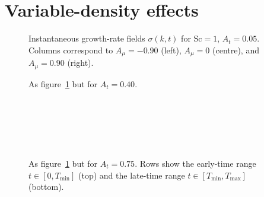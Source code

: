 \section{Variable-density effects}
\label{sec:variable_density}

\newcommand{\sigmarow}[3]{%
  \begin{minipage}{0.32\linewidth}\centering\end{minipage}\hfill
  \begin{minipage}{0.32\linewidth}\centering\end{minipage}\hfill
  \begin{minipage}{0.32\linewidth}\centering\end{minipage}%
}


\begin{figure}[p]
  \centering
  \sigmarow{VD_P1_Sc1_At0p05}{full}{}
  \caption{Instantaneous growth-rate fields $\sigma(k,t)$ for $\mathrm{Sc}=1$, $A_t=0.05$.
           Columns correspond to $A_\mu=-0.90$ (left), $A_\mu=0$ (centre), and $A_\mu=0.90$ (right).}
  \label{fig:VD_sigma_Sc1_At0p05}
\end{figure}

\begin{figure}[p]
  \centering
  \sigmarow{VD_P1_Sc1_At0p40}{full}{}
  \caption{As figure~\ref{fig:VD_sigma_Sc1_At0p05} but for $A_t=0.40$.}
  \label{fig:VD_sigma_Sc1_At0p40}
\end{figure}

\begin{figure}[p]
  \centering
  \begin{minipage}[t]{0.32\linewidth}\centering
    \\[2pt]
    
  \end{minipage}\hfill
  \begin{minipage}[t]{0.32\linewidth}\centering
    \\[2pt]
    
  \end{minipage}\hfill
  \begin{minipage}[t]{0.32\linewidth}\centering
    \\[2pt]
    
  \end{minipage}
  \caption{As figure~\ref{fig:VD_sigma_Sc1_At0p05} but for $A_t=0.75$.
           Rows show the early-time range $t\in[0,T_{\min}]$ (top) and the late-time range
           $t\in[T_{\min},T_{\max}]$ (bottom).}
  \label{fig:VD_sigma_Sc1_At0p75}
\end{figure}


